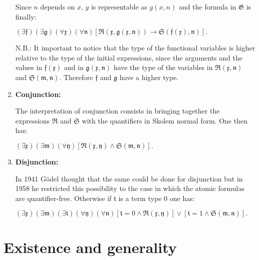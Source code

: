 \documentclass[12pt]{article}
\begin{document}
\begin{enumerate}
Since $n$ depends on $x$, $g$ is representable as $g (x, n)$ and the formula in $\mathfrak{G}$ is finally:

\begin{center}
$(\exists \mathfrak{f}) (\exists \mathfrak{g}) (\forall \mathfrak{x}) (\forall \mathfrak{n}) [\mathfrak{R} (\mathfrak{x}, \mathfrak{g} (\mathfrak{x}, \mathfrak{n})) \rightarrow \mathfrak{S} (\mathfrak{f} (\mathfrak{x}), \mathfrak{n})].$
\end{center}

N.B.: It important to notice that the type of the functional variables is higher relative to the type of the initial expressions, since the arguments and the values in $\mathfrak{f} (\mathfrak{x})$ and in $\mathfrak{g} (\mathfrak{x}, \mathfrak{n})$ have the type of the variables in $\mathfrak{R} (\mathfrak{x}, \mathfrak{n})$ and $\mathfrak{S} (\mathfrak{m}, \mathfrak{n})$. Therefore $\mathfrak{f}$ and $\mathfrak{g}$ have a higher type. 

\item \textbf{Conjunction:}

The interpretation of conjunction consists in bringing together the expressions $\mathfrak{R}$ and $\mathfrak{S}$ with the quantifiers in Skolem normal form. One then has:

\begin{center}
$(\exists \mathfrak{x}) (\exists \mathfrak{m}) (\forall \mathfrak{y}) [\mathfrak{R} (\mathfrak{x}, \mathfrak{y}) \wedge \mathfrak{S} (\mathfrak{m}, \mathfrak{n})].$
\end{center}

\item \textbf{Disjunction:}

In 1941 G\"odel thought that the same could be done for disjunction but in 1958 he restricted this possibility to the case in which the atomic formulas are quantifier-free. Otherwise if $\mathfrak{t}$ is a term type 0 one has:

\begin{center}
$(\exists \mathfrak{x}) (\exists \mathfrak{m}) (\exists \mathfrak{t}) (\forall \mathfrak{y}) (\forall \mathfrak{n}) {[ \mathfrak{t} = 0 \wedge \mathfrak{R} (\mathfrak{x}, \mathfrak{y})] \vee [ \mathfrak{t} = 1 \wedge \mathfrak{S} (\mathfrak{m}, \mathfrak{n})]}.$
\end{center}

\end{enumerate}

\section{Existence and generality}\normalsize
\end{document}
